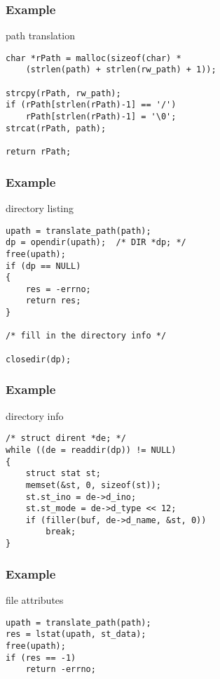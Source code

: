 \documentclass[dvipsnames]{beamer}
\begin{document}
\begin{frame}[fragile]
  \frametitle{Example}

  \begin{exampleblock}{path translation}
    \begin{lstlisting}
char *rPath = malloc(sizeof(char) *
    (strlen(path) + strlen(rw_path) + 1));

strcpy(rPath, rw_path);
if (rPath[strlen(rPath)-1] == '/')
    rPath[strlen(rPath)-1] = '\0';
strcat(rPath, path);

return rPath;
    \end{lstlisting}
  \end{exampleblock}
\end{frame}

\begin{frame}[fragile]
  \frametitle{Example}

  \begin{exampleblock}{directory listing}
    \begin{lstlisting}
upath = translate_path(path);
dp = opendir(upath);  /* DIR *dp; */
free(upath);
if (dp == NULL)
{
    res = -errno;
    return res;
}

/* fill in the directory info */

closedir(dp);
    \end{lstlisting}
  \end{exampleblock}
\end{frame}

\begin{frame}[fragile]
  \frametitle{Example}

  \begin{exampleblock}{directory info}
    \begin{lstlisting}
/* struct dirent *de; */
while ((de = readdir(dp)) != NULL)
{
    struct stat st;
    memset(&st, 0, sizeof(st));
    st.st_ino = de->d_ino;
    st.st_mode = de->d_type << 12;
    if (filler(buf, de->d_name, &st, 0))
        break;
}
    \end{lstlisting}
  \end{exampleblock}
\end{frame}

\begin{frame}[fragile]
  \frametitle{Example}

  \begin{exampleblock}{file attributes}
    \begin{lstlisting}
upath = translate_path(path);
res = lstat(upath, st_data);
free(upath);
if (res == -1)
    return -errno;
    \end{lstlisting}
  \end{exampleblock}
\end{frame}
\end{document}
